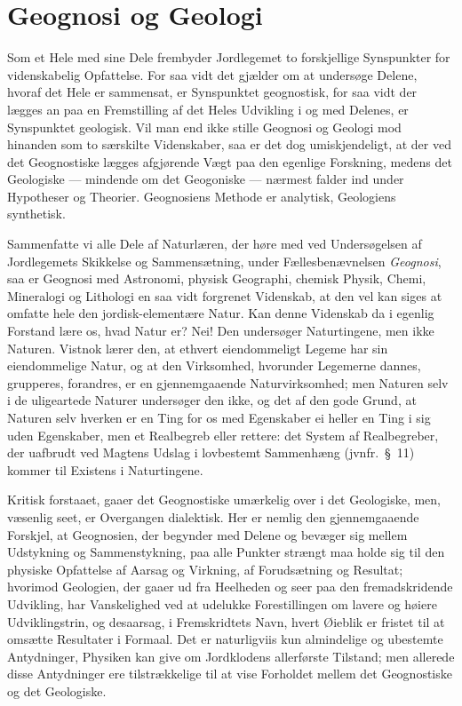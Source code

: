 \documentclass[12pt]{book}
\newcommand{\apage}[1]{\marginnote{\footnotesize\textit{[#1]}}}
\begin{document}
\section{Geognosi og Geologi}
\label{sec:16}

\noindent Som et Hele med sine Dele frembyder Jordlegemet to forskjellige
Synspunkter for videnskabelig Opfattelse. For saa vidt det gjælder om at
undersøge Delene, hvoraf det Hele er sammensat, er Synspunktet geognostisk,
for saa vidt der lægges an paa en Fremstilling af det Heles Udvikling i og
med Delenes, er Synspunktet geologisk. Vil man end ikke stille Geognosi og
Geologi mod hinanden som to særskilte Videnskaber, saa er det dog
umiskjendeligt, at der ved det Geognostiske lægges afgjørende Vægt paa den
egenlige Forskning, medens det Geologiske --- mindende om det Geogoniske --- nærmest falder ind under  \apage{161} Hypotheser og Theorier. Geognosiens Methode er
analytisk, Geologiens synthetisk.

Sammenfatte vi alle Dele af Naturlæren, der høre med ved Undersøgelsen af
Jordlegemets Skikkelse og Sammensætning, under Fællesbenævnelsen \emph{Geognosi},
saa er Geognosi med Astronomi, physisk Geographi, chemisk Physik, Chemi,
Mineralogi og Lithologi en saa vidt forgrenet Videnskab, at den vel kan
siges at omfatte hele den jordisk-elementære Natur. Kan denne Videnskab da
i egenlig Forstand lære os, hvad Natur er? Nei! Den undersøger
Naturtingene, men ikke Naturen. Vistnok lærer den, at ethvert eiendommeligt
Legeme har sin eiendommelige Natur, og at den Virksomhed, hvorunder
Legemerne dannes, grupperes, forandres, er en gjennemgaaende
Naturvirksomhed; men Naturen selv i de uligeartede Naturer undersøger den
ikke, og det af den gode Grund, at Naturen selv hverken er en Ting for os
med Egenskaber ei heller en Ting i sig uden Egenskaber, men et Realbegreb
eller rettere: det System af Realbegreber, der uafbrudt ved Magtens Udslag
i lovbestemt Sammenhæng (jvnfr.\ §\ 11) kommer til Existens i
Naturtingene.

Kritisk forstaaet, gaaer det Geognostiske umærkelig over i det Geologiske,
men, væsenlig seet, er Overgangen dialektisk. Her er nemlig den
gjennemgaaende Forskjel, at Geognosien, der begynder med Delene og bevæger
sig mellem Udstykning og Sammenstykning, paa alle Punkter strængt maa holde
sig til den physiske Opfattelse af Aarsag og Virkning, af Forudsætning og
Resultat; hvorimod Geologien, der gaaer ud fra \apage{162} Heelheden og seer paa den
fremadskridende Udvikling, har Vanskelighed ved at udelukke Forestillingen
om lavere og høiere Udviklingstrin, og desaarsag, i Fremskridtets Navn,
hvert Øieblik er fristet til at omsætte Resultater i Formaal. Det er
naturligviis kun almindelige og ubestemte Antydninger, Physiken kan give om
Jordklodens allerførste Tilstand; men allerede disse Antydninger ere
tilstrækkelige til at vise Forholdet mellem det Geognostiske og det
Geologiske.
\end{document}
